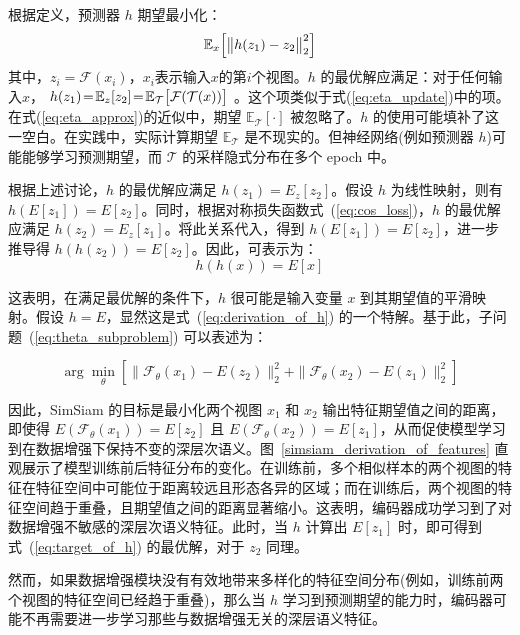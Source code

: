 \documentclass[master]{thesis-uestc}
\begin{document}
根据定义，预测器 $h$ 期望最小化：
\begin{equation}
\mathbb{E}_{x}\Big{[}\big{\|}h(z_{1})-z_{2}\big{\|}_{2}^{2}\Big{]} 
\label{eq:target_of_h}
\end{equation}
其中，$z_i = \mathcal{F}(x_i)$，$x_i$表示输入$x$的第$i$个视图。$h$ 的最优解应满足：对于任何输入$x$， $h(z_{1})\!=\!\mathbb{E}_{z}[z_{2}]\!=\!\mathbb{E}_{\mathcal{T}}\big{[}\mathcal{F}( \mathcal{T}(x))\big{]}$ 。这个项类似于式(\ref{eq:eta_update})中的项。在式(\ref{eq:eta_approx})的近似中，期望 $\mathbb{E}_{\mathcal{T}}[\cdot]$ 被忽略了。$h$ 的使用可能填补了这一空白。在实践中，实际计算期望 $\mathbb{E}_{\mathcal{T}}$ 是不现实的。但神经网络(例如预测器 $h$)可能能够学习预测期望，而 $\mathcal{T}$ 的采样隐式分布在多个 epoch 中。

根据上述讨论，$h$ 的最优解应满足 $h(z_1) = E_z[z_2]$。假设 $h$ 为线性映射，则有 $h(E[z_1]) = E[z_2]$。同时，根据对称损失函数式~(\ref{eq:cos_loss})，$h$ 的最优解应满足 $h(z_2) = E_z[z_1]$。将此关系代入，得到 $h(E[z_1]) = E[z_2]$，进一步推导得 $h(h(z_2)) = E[z_2]$。因此，可表示为：
\begin{equation}
    h(h(x)) = E[x]
    \label{eq:derivation_of_h}
\end{equation}

这表明，在满足最优解的条件下，$h$ 很可能是输入变量 $x$ 到其期望值的平滑映射。假设 $h = E$，显然这是式~(\ref{eq:derivation_of_h}) 的一个特解。基于此，子问题~(\ref{eq:theta_subproblem}) 可以表述为：

\begin{equation}
    \arg\min_{\theta} \left[\| \mathcal{F}_{\theta}(x_1) - E(z_2) \|_2^2 + \| \mathcal{F}_{\theta}(x_2) - E(z_1) \|_2^2 \right]
\end{equation}

因此，SimSiam 的目标是最小化两个视图 \( x_1 \) 和 \( x_2 \) 输出特征期望值之间的距离，即使得 \( E(\mathcal{F}_\theta(x_1)) = E[z_2] \) 且 \( E(\mathcal{F}_\theta(x_2)) = E[z_1] \)，从而促使模型学习到在数据增强下保持不变的深层次语义。图~\ref{simsiam_derivation_of_features} 直观展示了模型训练前后特征分布的变化。在训练前，多个相似样本的两个视图的特征在特征空间中可能位于距离较远且形态各异的区域；而在训练后，两个视图的特征空间趋于重叠，且期望值之间的距离显著缩小。这表明，编码器成功学习到了对数据增强不敏感的深层次语义特征。此时，当 \( h \) 计算出 \( E[z_1] \) 时，即可得到式~(\ref{eq:target_of_h}) 的最优解，对于 \( z_2 \) 同理。

然而，如果数据增强模块没有有效地带来多样化的特征空间分布(例如，训练前两个视图的特征空间已经趋于重叠)，那么当 \( h \) 学习到预测期望的能力时，编码器可能不再需要进一步学习那些与数据增强无关的深层语义特征。
\end{document}
